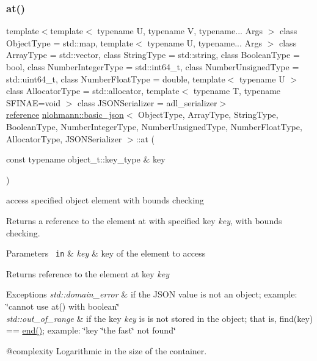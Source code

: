 \subsubsection{\texorpdfstring{at()}{at()}\hspace{0.1cm}{\footnotesize\ttfamily [3/6]}}
{\footnotesize\ttfamily template$<$template$<$ typename U, typename V, typename... Args $>$ class Object\+Type = std\+::map, template$<$ typename U, typename... Args $>$ class Array\+Type = std\+::vector, class String\+Type  = std\+::string, class Boolean\+Type  = bool, class Number\+Integer\+Type  = std\+::int64\+\_\+t, class Number\+Unsigned\+Type  = std\+::uint64\+\_\+t, class Number\+Float\+Type  = double, template$<$ typename U $>$ class Allocator\+Type = std\+::allocator, template$<$ typename T, typename S\+F\+I\+N\+A\+E=void $>$ class J\+S\+O\+N\+Serializer = adl\+\_\+serializer$>$ \\
\mbox{\hyperlink{classnlohmann_1_1basic__json_ac6a5eddd156c776ac75ff54cfe54a5bc}{reference}} \mbox{\hyperlink{classnlohmann_1_1basic__json}{nlohmann\+::basic\+\_\+json}}$<$ Object\+Type, Array\+Type, String\+Type, Boolean\+Type, Number\+Integer\+Type, Number\+Unsigned\+Type, Number\+Float\+Type, Allocator\+Type, J\+S\+O\+N\+Serializer $>$\+::at (\begin{DoxyParamCaption}\item[{const typename object\+\_\+t\+::key\+\_\+type \&}]{key }\end{DoxyParamCaption})\hspace{0.3cm}{\ttfamily [inline]}}



access specified object element with bounds checking 

Returns a reference to the element at with specified key {\itshape key}, with bounds checking.


\begin{DoxyParams}[1]{Parameters}
\mbox{\texttt{ in}}  & {\em key} & key of the element to access\\
\hline
\end{DoxyParams}
\begin{DoxyReturn}{Returns}
reference to the element at key {\itshape key} 
\end{DoxyReturn}

\begin{DoxyExceptions}{Exceptions}
{\em std\+::domain\+\_\+error} & if the J\+S\+ON value is not an object; example\+: {\ttfamily \char`\"{}cannot use at() with boolean\char`\"{}} \\
\hline
{\em std\+::out\+\_\+of\+\_\+range} & if the key {\itshape key} is is not stored in the object; that is, {\ttfamily find(key) == \mbox{\hyperlink{classnlohmann_1_1basic__json_a13e032a02a7fd8a93fdddc2fcbc4763c}{end()}}}; example\+: {\ttfamily \char`\"{}key \char`\"{}the fast\char`\"{} not found\char`\"{}}\\
\hline
\end{DoxyExceptions}
@complexity Logarithmic in the size of the container.

